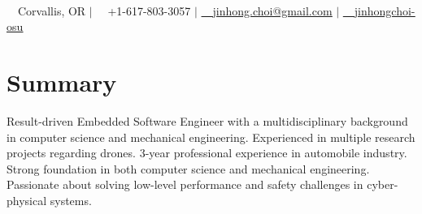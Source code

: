 \documentclass[letterpaper,10.5pt]{article}
\begin{document}

\begin{center}
    \textbf{\huge{}\selectfont{Jinhong ``Jin'' Choi}} \\ \vspace{5pt}
    
    \small {\faMapMarker~~Corvallis, OR} $|$
    \faMobile~~+1-617-803-3057 $|$ \href{mailto:jinhong.choi@gmail.com}
    {\faEnvelope~~\underline{jinhong.choi@gmail.com}} $|$ 
    \href{https://linkedin.com/in/jinhongchoi-osu}{\faLinkedin~~\underline{jinhongchoi-osu}}
\end{center}


\section{Summary}
\vspace{-2pt}
\begin{itemize}[leftmargin=0.05in, label={}, rightmargin=0.2in]
\small{\item{Result-driven Embedded Software Engineer with a multidisciplinary background in computer science and mechanical engineering. Experienced in multiple research projects regarding drones. 3-year professional experience in automobile industry. Strong foundation in both computer science and mechanical engineering. Passionate about solving low-level performance and safety challenges in cyber-physical systems.}}
\end{itemize}\vspace{-1.5em}
\end{document}
